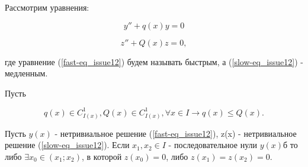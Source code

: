 \begin{theorem}

Рассмотрим уравнения:

\begin{equation}\label{fast-eq_issue12}
y'' + q(x) y = 0
\end{equation}

\begin{equation}\label{slow-eq_issue12}
z'' + Q(x)z = 0,
\end{equation}

где уравнение (\ref{fast-eq_issue12}) будем называть быстрым, а (\ref{slow-eq_issue12}) - медленным.

Пусть 

\[q(x)\in C^1_{I(x)}, Q(x) \in C^1_{I(x)}, \forall x \in I \rightarrow q(x) \leq Q(x).\]

Пусть $y(x)$ - нетривиальное решение (\ref{fast-eq_issue12}), z(x) - нетривиальное решение (\ref{slow-eq_issue12}). Если $x_1, x_2 \in I$ - последовательное нули $y(x)$б то либо $\exists x_0 \in (x_1;x_2)$, в которой $z(x_0) = 0$, либо $z(x_1) = z(x_2) = 0$.
\end{theorem}

